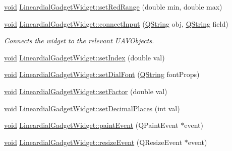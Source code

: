 \begin{DoxyCompactItemize}
\item 
\hyperlink{group___u_a_v_objects_plugin_ga444cf2ff3f0ecbe028adce838d373f5c}{void} \hyperlink{group___linear_dial_plugin_gac43bdb344ff4fa3376e0c38358b9ae22}{\-Lineardial\-Gadget\-Widget\-::set\-Red\-Range} (double min, double max)
\item 
\hyperlink{group___u_a_v_objects_plugin_ga444cf2ff3f0ecbe028adce838d373f5c}{void} \hyperlink{group___linear_dial_plugin_gae8c680251e4f8898f8653b6aede9fc81}{\-Lineardial\-Gadget\-Widget\-::connect\-Input} (\hyperlink{group___u_a_v_objects_plugin_gab9d252f49c333c94a72f97ce3105a32d}{\-Q\-String} obj, \hyperlink{group___u_a_v_objects_plugin_gab9d252f49c333c94a72f97ce3105a32d}{\-Q\-String} field)
\begin{DoxyCompactList}\small\item\em \-Connects the widget to the relevant \-U\-A\-V\-Objects. \end{DoxyCompactList}\item 
\hyperlink{group___u_a_v_objects_plugin_ga444cf2ff3f0ecbe028adce838d373f5c}{void} \hyperlink{group___linear_dial_plugin_ga68d6c562622c590886f5d3efceac4349}{\-Lineardial\-Gadget\-Widget\-::set\-Index} (double val)
\item 
\hyperlink{group___u_a_v_objects_plugin_ga444cf2ff3f0ecbe028adce838d373f5c}{void} \hyperlink{group___linear_dial_plugin_ga65e46979b848fd423f40d6b001e04ffa}{\-Lineardial\-Gadget\-Widget\-::set\-Dial\-Font} (\hyperlink{group___u_a_v_objects_plugin_gab9d252f49c333c94a72f97ce3105a32d}{\-Q\-String} font\-Props)
\item 
\hyperlink{group___u_a_v_objects_plugin_ga444cf2ff3f0ecbe028adce838d373f5c}{void} \hyperlink{group___linear_dial_plugin_gad4c7bf09ce46f89db163dee80784418b}{\-Lineardial\-Gadget\-Widget\-::set\-Factor} (double val)
\item 
\hyperlink{group___u_a_v_objects_plugin_ga444cf2ff3f0ecbe028adce838d373f5c}{void} \hyperlink{group___linear_dial_plugin_ga1c62c1ba4256fcbe4654bb904003c3b5}{\-Lineardial\-Gadget\-Widget\-::set\-Decimal\-Places} (int val)
\item 
\hyperlink{group___u_a_v_objects_plugin_ga444cf2ff3f0ecbe028adce838d373f5c}{void} \hyperlink{group___linear_dial_plugin_ga80239da240f9678e9cf4d2de3d9f6568}{\-Lineardial\-Gadget\-Widget\-::paint\-Event} (\-Q\-Paint\-Event $\ast$event)
\item 
\hyperlink{group___u_a_v_objects_plugin_ga444cf2ff3f0ecbe028adce838d373f5c}{void} \hyperlink{group___linear_dial_plugin_ga6f18ff48bf1851067cbd13d56f04fd73}{\-Lineardial\-Gadget\-Widget\-::resize\-Event} (\-Q\-Resize\-Event $\ast$event)

\end{DoxyCompactItemize}
